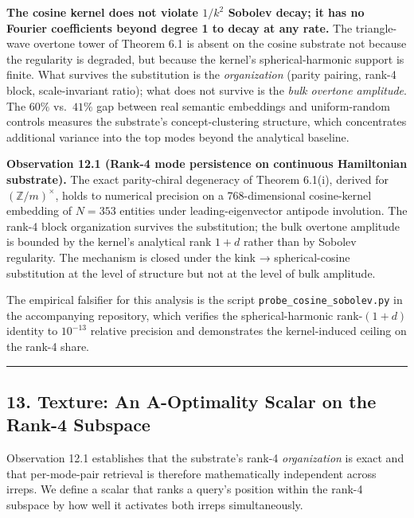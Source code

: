 \documentclass[
  11pt,
]{article}
\begin{document}
\textbf{The cosine kernel does not violate \(1/k^2\) Sobolev decay; it
has no Fourier coefficients beyond degree 1 to decay at any rate.} The
triangle-wave overtone tower of Theorem 6.1 is absent on the cosine
substrate not because the regularity is degraded, but because the
kernel's spherical-harmonic support is finite. What survives the
substitution is the \emph{organization} (parity pairing, rank-4 block,
scale-invariant ratio); what does not survive is the \emph{bulk overtone
amplitude}. The \(60\%\) vs.~\(41\%\) gap between real semantic
embeddings and uniform-random controls measures the substrate's
concept-clustering structure, which concentrates additional variance
into the top modes beyond the analytical baseline.

\textbf{Observation 12.1 (Rank-4 mode persistence on continuous
Hamiltonian substrate).} The exact parity-chiral degeneracy of Theorem
6.1(i), derived for \((\mathbb{Z}/m)^\times\), holds to numerical
precision on a 768-dimensional cosine-kernel embedding of \(N = 353\)
entities under leading-eigenvector antipode involution. The rank-4 block
organization survives the substitution; the bulk overtone amplitude is
bounded by the kernel's analytical rank \(1 + d\) rather than by Sobolev
regularity. The mechanism is closed under the kink → spherical-cosine
substitution at the level of structure but not at the level of bulk
amplitude.

The empirical falsifier for this analysis is the script
\texttt{probe\_cosine\_sobolev.py} in the accompanying repository, which
verifies the spherical-harmonic rank-\((1+d)\) identity to \(10^{-13}\)
relative precision and demonstrates the kernel-induced ceiling on the
rank-4 share.

\begin{center}\rule{0.5\linewidth}{0.5pt}\end{center}

\subsection{13. Texture: An A-Optimality Scalar on the Rank-4
Subspace}\label{texture-an-a-optimality-scalar-on-the-rank-4-subspace}

Observation 12.1 establishes that the substrate's rank-4
\emph{organization} is exact and that per-mode-pair retrieval is
therefore mathematically independent across irreps. We define a scalar
that ranks a query's position within the rank-4 subspace by how well it
activates both irreps simultaneously.
\end{document}
